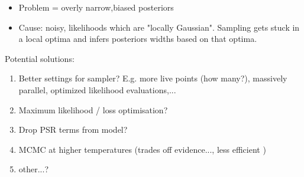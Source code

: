 \documentclass[10pt]{beamer}
\begin{document}
\begin{frame}{}
	
		\begin{itemize}
		\item \alert{Problem} = overly narrow,biased posteriors
		\item Cause: noisy, likelihoods which are "locally Gaussian". Sampling gets stuck in a local optima and infers posteriors widths based on that optima. 
%
	\end{itemize}
	
	
	
\end{frame}


\begin{frame}{}
	Potential solutions:
	
	\begin{enumerate}
		\item Better settings for sampler? E.g. more live points (how many?), massively parallel, optimized likelihood evaluations,...
		\item Maximum likelihood / loss optimisation? 
		\item Drop PSR terms from model?
		\item MCMC at higher temperatures (trades off evidence..., less efficient	)
		\item other...?
	\end{enumerate}
	
	
\end{frame}
\end{document}
